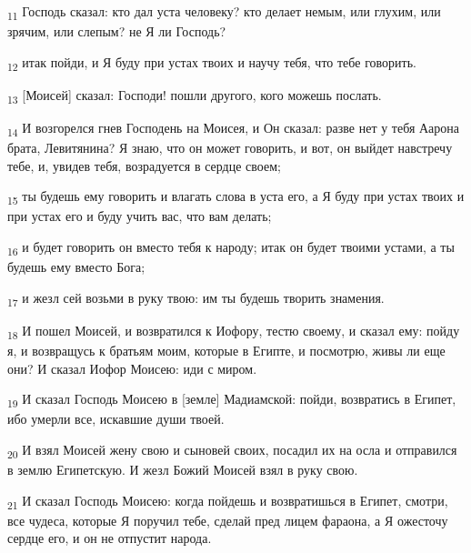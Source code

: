 \begin{tcolorbox}
\textsubscript{11} Господь сказал: кто дал уста человеку? кто делает немым, или глухим, или зрячим, или слепым? не Я ли Господь?
\end{tcolorbox}
\begin{tcolorbox}
\textsubscript{12} итак пойди, и Я буду при устах твоих и научу тебя, что тебе говорить.
\end{tcolorbox}
\begin{tcolorbox}
\textsubscript{13} [Моисей] сказал: Господи! пошли другого, кого можешь послать.
\end{tcolorbox}
\begin{tcolorbox}
\textsubscript{14} И возгорелся гнев Господень на Моисея, и Он сказал: разве нет у тебя Аарона брата, Левитянина? Я знаю, что он может говорить, и вот, он выйдет навстречу тебе, и, увидев тебя, возрадуется в сердце своем;
\end{tcolorbox}
\begin{tcolorbox}
\textsubscript{15} ты будешь ему говорить и влагать слова в уста его, а Я буду при устах твоих и при устах его и буду учить вас, что вам делать;
\end{tcolorbox}
\begin{tcolorbox}
\textsubscript{16} и будет говорить он вместо тебя к народу; итак он будет твоими устами, а ты будешь ему вместо Бога;
\end{tcolorbox}
\begin{tcolorbox}
\textsubscript{17} и жезл сей возьми в руку твою: им ты будешь творить знамения.
\end{tcolorbox}
\begin{tcolorbox}
\textsubscript{18} И пошел Моисей, и возвратился к Иофору, тестю своему, и сказал ему: пойду я, и возвращусь к братьям моим, которые в Египте, и посмотрю, живы ли еще они? И сказал Иофор Моисею: иди с миром.
\end{tcolorbox}
\begin{tcolorbox}
\textsubscript{19} И сказал Господь Моисею в [земле] Мадиамской: пойди, возвратись в Египет, ибо умерли все, искавшие души твоей.
\end{tcolorbox}
\begin{tcolorbox}
\textsubscript{20} И взял Моисей жену свою и сыновей своих, посадил их на осла и отправился в землю Египетскую. И жезл Божий Моисей взял в руку свою.
\end{tcolorbox}
\begin{tcolorbox}
\textsubscript{21} И сказал Господь Моисею: когда пойдешь и возвратишься в Египет, смотри, все чудеса, которые Я поручил тебе, сделай пред лицем фараона, а Я ожесточу сердце его, и он не отпустит народа.
\end{tcolorbox}
